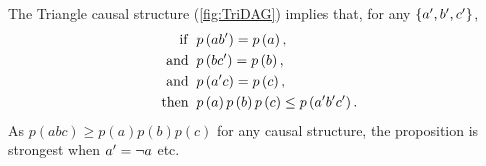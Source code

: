 
\begin{proposition} \label{prop:TriNoGo}
The Triangle causal structure (\cref{fig:TriDAG}) implies that, for any $\lbrace{\ensuremath{a^{\prime}},\ensuremath{b^{\prime}},\ensuremath{c^{\prime}}\rbrace}$,
\begin{align}
{\rm if  }\;\; &p\left(ab^{\prime}\right)=p\left(a\right),\label{eq:AimpNotBsource}\\
{\rm and }\;\; &p\left(bc^{\prime}\right)=p\left(b\right),\label{eq:BimpNotCsource}\\
{\rm and }\;\; &p\left(a^{\prime} c\right)=p\left(c\right),\label{eq:CimpNotAsource}\\
{\rm then }\;\; &p\left(a\right)p\left(b\right)p\left(c\right)\leq p\left(a^{\prime}b^{\prime}c^{\prime}\right).\label{eq:spekkensresult}
\end{align}
As $p\left(abc\right)\geq p\left(a\right)p\left(b\right)p\left(c\right)$ for any causal structure, the proposition is strongest when $a^{\prime}=\lnot a$ etc.
\end{proposition}

